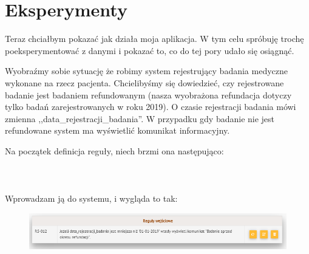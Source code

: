 \section{Eksperymenty}
Teraz chciałbym pokazać jak działa moja aplikacja. W tym celu spróbuję trochę poeksperymentować z danymi i pokazać to, co do tej pory udało się osiągnąć.


Wyobraźmy sobie sytuację że robimy system rejestrujący badania medyczne wykonane na rzecz pacjenta. Chcielibyśmy się dowiedzieć, czy rejestrowane badanie jest badaniem refundowanym (nasza wyobrażona refundacja dotyczy tylko badań zarejestrowanych w roku 2019). O czasie rejestracji badania mówi zmienna ,,data\_rejestracji\_badania''. W przypadku gdy badanie nie jest refundowane system ma wyświetlić komunikat informacyjny. 

Na początek definicja reguły, niech brzmi ona następująco:
\\ \\
\\ \\
Wprowadzam ją do systemu, i wygląda to tak:
\begin{figure}[H]
	\centering
	\includegraphics[scale=0.8]{img/app-eksperymenty/p1-1.png}
\end{figure}

